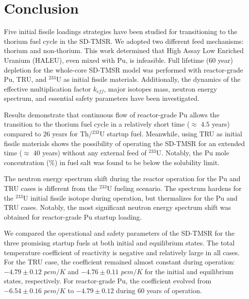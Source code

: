 \section{Conclusion} \label{Conclusion}
Five initial fissile loadings strategies have been studied for 
transitioning to the thorium fuel cycle in the SD-TMSR. We 
adopted two different feed mechanisms: thorium and non-thorium. 
This work determined that High Assay Low Enriched Uranium (HALEU), even mixed with Pu, is infeasible. 
Full lifetime (60 year) depletion for the whole-core SD-TMSR model was 
performed with reactor-grade Pu, TRU, and $^{233}$U as initial fissile 
materials. Additionally, the dynamics of the effective multiplication factor 
$k_{eff}$, major isotopes mass, neutron energy spectrum, and essential safety 
parameters have been investigated. 

Results demonstrate that continuous flow of reactor-grade Pu allows the 
transition to the thorium fuel cycle in a relatively short time ($\approx$ 
$4.5$ years) compared to $26$ years for Th/$^{233}$U startup fuel. 
Meanwhile, using \gls{TRU} as initial fissile materials shows the possibility 
of operating the SD-TMSR for an extended time ($\approx$ $40$ years) 
without any external feed of $^{233}$U. Notably, the Pu mole concentration (\%) in 
fuel salt was found to be below the solubility limit. 

The neutron energy spectrum shift during the reactor operation 
for the Pu and TRU cases is different from the $^{233}$U fueling scenario. 
The spectrum hardens for the $^{233}$U initial fissile isotope during 
operation, but thermalizes for the Pu and TRU cases. Notably, the most 
significant neutron energy spectrum shift was obtained for reactor-grade Pu 
startup loading. 

We compared the operational and safety parameters of the \gls{SD-TMSR} for the 
three promising startup fuels at both initial and equilibrium states. The total 
temperature coefficient of reactivity is negative and relatively large in all 
cases. For the TRU case, the coefficient remained almost constant during 
operation: $-4.79\pm0.12$ $pcm/K$ and $-4.76\pm0.11$ $pcm/K$ for the initial 
and equilibrium states, respectively. For reactor-grade Pu, the coefficient 
evolved from $-6.54\pm0.16$ $pcm/K$ to $-4.79\pm0.12$ during 
60 years of operation. 

